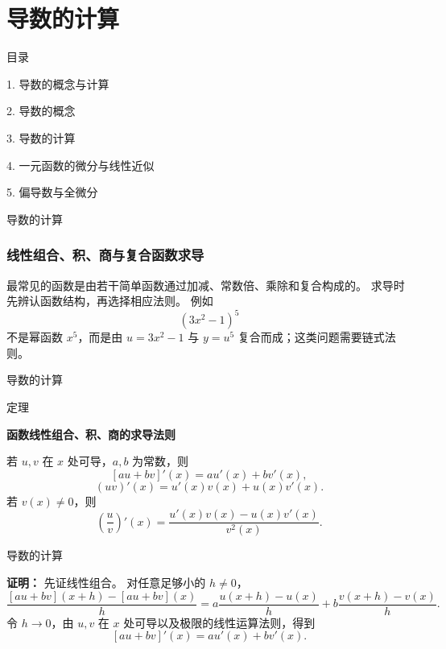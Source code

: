 \documentclass[aspectratio=169,10pt,fontset=fandol]{ctexbeamer}
\begin{document}
\section{导数的计算}
\begin{frame}[t,fragile]{目录}
\normalsize
{\color{black}\normalsize 1. 导数的概念与计算\par}\vspace{0.22em}
{\color{black}\normalsize 2. 导数的概念\par}\vspace{0.22em}
{\color{blue}\normalsize 3. 导数的计算\par}\vspace{0.22em}
{\color{gray!40}\normalsize 4. 一元函数的微分与线性近似\par}\vspace{0.22em}
{\color{gray!40}\normalsize 5. 偏导数与全微分\par}\vspace{0.22em}
\end{frame}
\begin{frame}[t,fragile]{导数的计算}
\normalsize
{\normalsize

\subsubsection*{线性组合、积、商与复合函数求导}


}
{\normalsize
最常见的函数是由若干简单函数通过加减、常数倍、乘除和复合构成的。 求导时先辨认函数结构，再选择相应法则。 例如
\[
(3x^2-1)^5
\]
不是幂函数 $x^5$，而是由 $u=3x^2-1$ 与 $y=u^5$ 复合而成；这类问题需要链式法则。


}
\end{frame}
\begin{frame}[t,fragile]{导数的计算}
\normalsize
\begin{block}{定理}
{\normalsize
\textbf{函数线性组合、积、商的求导法则}\par

若 $u,v$ 在 $x$ 处可导，$a,b$ 为常数，则
\[
[au+bv]'(x)=au'(x)+bv'(x),
\]
\[
(uv)'(x)=u'(x)v(x)+u(x)v'(x).
\]
若 $v(x)\neq0$，则
\[
\left(\frac{u}{v}\right)'(x)=\frac{u'(x)v(x)-u(x)v'(x)}{v^2(x)}.
\]

}
\end{block}
\end{frame}
\begin{frame}[t,fragile]{导数的计算}
\normalsize
{\normalsize
\textbf{证明：}
先证线性组合。 对任意足够小的 $h\neq0$，
\[
\frac{[au+bv](x+h)-[au+bv](x)}{h}
=a\frac{u(x+h)-u(x)}{h}
+b\frac{v(x+h)-v(x)}{h}.
\]
令 $h\to0$，由 $u,v$ 在 $x$ 处可导以及极限的线性运算法则，得到
\[
[au+bv]'(x)=au'(x)+bv'(x).
\]


}
\end{frame}
\end{document}

